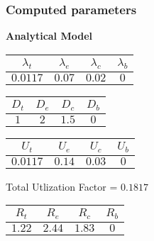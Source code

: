 \documentclass{article}
\begin{document}
\subsubsection{Computed parameters}
\begin{minipage}{0.5\textwidth}
\centering	\textbf{Analytical Model}
\begin{table}[H]
\centering
\begin{tabular}{@{}cccc@{}}
\toprule
$\lambda_t$ & $\lambda_e$ & $\lambda_c$ & $\lambda_b$\\
\midrule
$0.0117$ & $0.07$ & $0.02$ & $0$\\
\bottomrule
\end{tabular}
\end{table}\begin{table}[H]
\centering
\begin{tabular}{@{}cccc@{}}
\toprule
$D_t$ & $D_e$ & $D_c$ & $D_b$\\
\midrule
$1$ & $2$ & $1.5$ & $0$\\
\bottomrule
\end{tabular}
\end{table}\begin{table}[H]
\centering
\begin{tabular}{@{}cccc@{}}
\toprule
$U_t$ & $U_e$ & $U_c$ & $U_b$\\
\midrule
$0.0117$ & $0.14$ & $0.03$ & $0$\\
\bottomrule
\end{tabular}
\end{table}
\centering Total Utlization Factor = $0.1817$
\begin{table}[H]
\centering
\begin{tabular}{@{}cccc@{}}
\toprule
$R_t$ & $R_e$ & $R_c$ & $R_b$\\
\midrule
$1.22$ & $2.44$ & $1.83$ & $0$\\
\bottomrule
\end{tabular}
\end{table}
\end{minipage}
\end{document}
